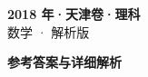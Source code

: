 \documentclass[zihao=-4, a4paper]{ctexart}
\begin{document}
\begin{center}
  {\Large\bfseries 2018 年·天津卷·理科}\\[4pt]
  {\large 数学 · 解析版}
\end{center}
\medskip
{}

\clearpage
{}
\begin{center}{\Large\bfseries 参考答案与详细解析}\end{center}
\medskip

\end{document}
